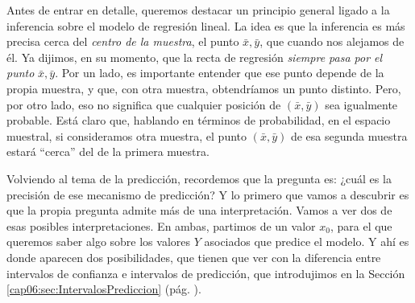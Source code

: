Antes de entrar en detalle, queremos destacar un principio general ligado a la inferencia sobre el modelo de regresión lineal. La idea es que la inferencia es más precisa cerca del {\em centro de la muestra}, el punto ${\bar x,\bar y}$, que cuando nos alejamos de él.  Ya dijimos, en su momento, que la recta de regresión {\em siempre pasa por el punto} ${\bar x,\bar y}$. Por un lado, es importante entender que ese punto depende de la propia muestra, y que, con otra muestra, obtendríamos un punto distinto. Pero, por otro lado, eso no significa que cualquier posición de $(\bar x, \bar y)$ sea igualmente probable.  Está claro que, hablando en términos de probabilidad, en el espacio muestral, si consideramos otra muestra, el punto $(\bar x, \bar y)$ de esa segunda muestra estará ``cerca'' del de la primera muestra.


%
%
Volviendo al tema de la predicción, recordemos que la pregunta es: ¿cuál es la precisión de ese mecanismo de predicción? Y lo primero que vamos a descubrir es que la propia pregunta admite más de una interpretación. Vamos a ver dos de esas posibles interpretaciones. En ambas, partimos de un valor $x_0$, para el que queremos saber algo sobre los valores $Y$ asociados que predice el modelo. Y ahí es donde aparecen dos posibilidades, que tienen que ver con la diferencia entre intervalos de confianza e intervalos de predicción, que introdujimos en la Sección \ref{cap06:sec:IntervalosPrediccion} (pág. \pageref{cap06:sec:IntervalosPrediccion}).
